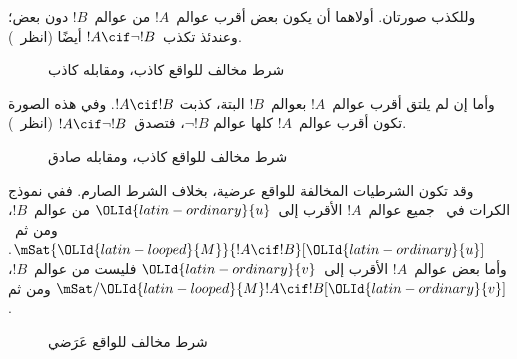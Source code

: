 \documentclass[../../../include/open-logic-section]{subfiles}
\begin{document}
وللكذب صورتان. أولاهما أن يكون بعض أقرب عوالم~$!A$ من عوالم~$!B$
دون بعض؛ وعندئذ تكذب~$!A \cif \lnot !B$ أيضًا
(انظر~).
\begin{figure}
\begin{center}
\caption{شرط مخالف للواقع كاذب، ومقابله كاذب}
\end{center}
\end{figure}
وأما إن لم يلتق أقرب عوالم~$!A$ بعوالم~$!B$ البتة، كذبت
$!A \cif !B$. وفي هذه الصورة تكون أقرب عوالم~$!A$ كلها عوالم
$\lnot !B$، فتصدق~$!A \cif \lnot !B$
(انظر~).
\begin{figure}
\begin{center}
\caption{شرط مخالف للواقع كاذب، ومقابله صادق}
\end{center}
\end{figure}

وقد تكون الشرطيات المخالفة للواقع عرضية، بخلاف الشرط الصارم. ففي نموذج
الكرات في~ جميع عوالم~$!A$ الأقرب إلى~$\OLId{latin-ordinary}{u}$ من
عوالم~$!B$، ومن ثم~$\mSat{\OLId{latin-looped}{M}}{!A \cif !B}[\OLId{latin-ordinary}{u}]$. وأما بعض عوالم~$!A$
الأقرب إلى~$\OLId{latin-ordinary}{v}$ فليست من عوالم~$!B$، ومن ثم
$\mSat/{\OLId{latin-looped}{M}}{!A \cif !B}[\OLId{latin-ordinary}{v}]$.
\begin{figure}
\begin{center}
\end{center}
\caption{شرط مخالف للواقع عَرَضي}
\end{figure}
\end{document}
